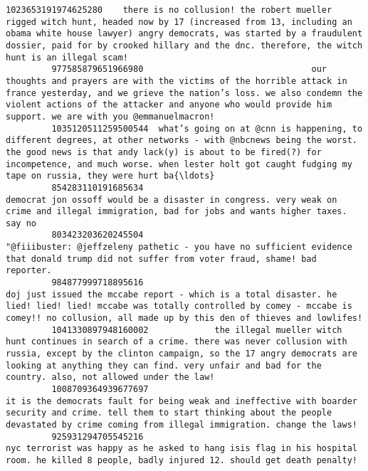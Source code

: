 \documentclass[11pt]{article}
\begin{document}
\begin{Verbatim}[commandchars=\\\{\}]
         1023653191974625280    there is no collusion! the robert mueller rigged witch hunt, headed now by 17 (increased from 13, including an obama white house lawyer) angry democrats, was started by a fraudulent dossier, paid for by crooked hillary and the dnc. therefore, the witch hunt is an illegal scam!   
         977585879651966980                                 our thoughts and prayers are with the victims of the horrible attack in france yesterday, and we grieve the nation’s loss. we also condemn the violent actions of the attacker and anyone who would provide him support. we are with you @emmanuelmacron!   
         1035120511259500544  what’s going on at @cnn is happening, to different degrees, at other networks - with @nbcnews being the worst. the good news is that andy lack(y) is about to be fired(?) for incompetence, and much worse. when lester holt got caught fudging my tape on russia, they were hurt ba{\ldots}   
         854283110191685634                                                                                                                                              democrat jon ossoff would be a disaster in congress. very weak on crime and illegal immigration, bad for jobs and wants higher taxes. say no   
         803423203620245504                                                                                                                                              "@fiiibuster: @jeffzeleny pathetic - you have no sufficient evidence that donald trump did not suffer from voter fraud, shame! bad reporter.   
         984877999718895616                                                                             doj just issued the mccabe report - which is a total disaster. he lied! lied! lied! mccabe was totally controlled by comey - mccabe is comey!! no collusion, all made up by this den of thieves and lowlifes!   
         1041330897948160002             the illegal mueller witch hunt continues in search of a crime. there was never collusion with russia, except by the clinton campaign, so the 17 angry democrats are looking at anything they can find. very unfair and bad for the country. also, not allowed under the law!   
         1008709364939677697                                                                             it is the democrats fault for being weak and ineffective with boarder security and crime. tell them to start thinking about the people devastated by crime coming from illegal immigration. change the laws!   
         925931294705545216                                                                                                                                               nyc terrorist was happy as he asked to hang isis flag in his hospital room. he killed 8 people, badly injured 12. should get death penalty!   

\end{Verbatim}
\end{document}
